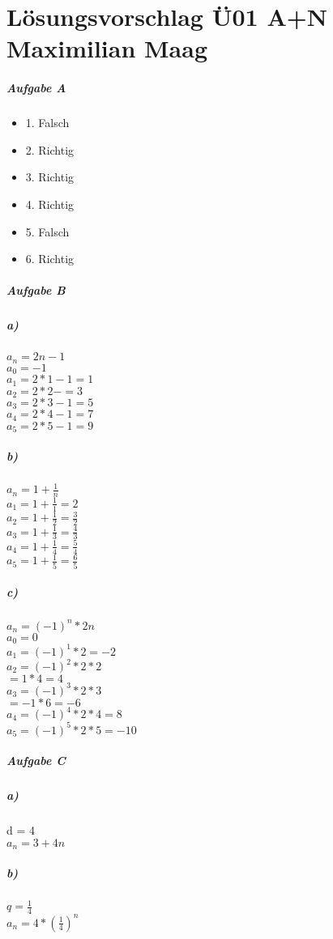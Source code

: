 \documentclass{article}
\begin{document}
	\section*{Lösungsvorschlag Ü01 A+N Maximilian Maag}
	\subparagraph*{Aufgabe A}
	\begin{itemize}
		\item 1. Falsch
		\item 2. Richtig
		\item 3. Richtig
		\item 4. Richtig
		\item 5. Falsch
		\item 6. Richtig
	\end{itemize}
	
	\subparagraph*{Aufgabe B}
	\subparagraph*{a)}
	  
	$a_{n} = 2n -1$ \\
	$a_{0} = -1$ \\
	$a_{1} = 2 * 1 - 1 = 1 $ \\
	$a_{2} = 2 * 2 - = 3 $ \\
	$a_{3} = 2*3 - 1 = 5 $ \\
	$a_{4} = 2*4 - 1 = 7 $ \\
	$a_{5} = 2*5-1 = 9 $ 
	
	\subparagraph*{b)}
	$a_{n} = 1 + \frac{1}{n}$ \\
	$a_{1} = 1 + \frac{1}{1} = 2$ \\
	$a_{2} = 1 + \frac{1}{2} = \frac{3}{2}$ \\
	$a_{3} = 1 + \frac{1}{3} = \frac{4}{3}$ \\
	$a_{4} = 1 + \frac{1}{4} = \frac{5}{4}$ \\
	$a_{5} = 1 + \frac{1}{5} = \frac{6}{5}$ 
	\subparagraph*{c)}
	$a_{n} = (-1)^{n} * 2n$ \\
	$a_{0} = 0$ \\
	$a_{1} = (-1)^{1} * 2 = -2$  \\
	$a_{2} = (-1)^{2} * 2*2$ \\
	$= 1 * 4 = 4$ \\
	$a_{3} = (-1)^{3} * 2*3$ \\
	$= -1 * 6 = -6$ \\
	$a_{4} = (-1)^{4} * 2*4 = 8$ \\
	$a_{5} = (-1)^{5} * 2*5 = -10$ 

	\subparagraph*{Aufgabe C}
	
	\subparagraph*{a)}
	d = 4 \\
	$a_{n} = 3 + 4n$
	\subparagraph*{b)}
	$q = \frac{1}{4}$ \\
	$a_{n} = 4 * (\frac{1}{4})^{n}$
	
\end{document}
